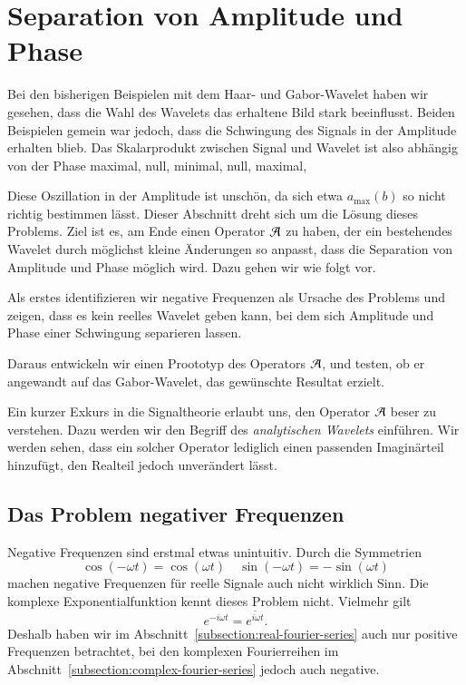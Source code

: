 \section{Separation von Amplitude und Phase}
\label{complex:separate}

Bei den bisherigen Beispielen mit dem Haar- und Gabor-Wavelet haben wir gesehen, dass die Wahl des Wavelets das erhaltene Bild stark beeinflusst.
Beiden Beispielen gemein war jedoch, dass die Schwingung des Signals in der Amplitude erhalten blieb.
Das Skalarprodukt zwischen Signal und Wavelet ist also abhängig von der Phase maximal, null, minimal, null, maximal, \textellipsis

Diese Oszillation in der Amplitude ist unschön, da sich etwa $a_\text{max}(b)$ so nicht richtig bestimmen lässt.
Dieser Abschnitt dreht sich um die Lösung dieses Problems.
Ziel ist es, am Ende einen Operator $\Ana\,$ zu haben, der ein bestehendes Wavelet durch möglichst kleine Änderungen so anpasst, dass die Separation von Amplitude und Phase möglich wird.
Dazu gehen wir wie folgt vor.

Als erstes identifizieren wir negative Frequenzen als Ursache des Problems und zeigen, dass es kein reelles Wavelet geben kann, bei dem sich Amplitude und Phase einer Schwingung separieren lassen.

Daraus entwickeln wir einen Proototyp des Operators $\Ana\,$, und testen, ob er angewandt auf das Gabor-Wavelet, das gewünschte Resultat erzielt.

Ein kurzer Exkurs in die Signaltheorie erlaubt uns, den Operator $\Ana\,$ beser zu verstehen. 
Dazu werden wir den Begriff des \emph{analytischen Wavelets} einführen.
Wir werden sehen, dass ein solcher Operator lediglich einen passenden Imaginärteil hinzufügt, den Realteil jedoch unverändert lässt.

\subsection{Das Problem negativer Frequenzen}
Negative Frequenzen sind erstmal etwas unintuitiv.
Durch die Symmetrien
\[
	\cos(-\omega t) = \cos(\omega t)
	\quad
	\sin(-\omega t) = -\sin(\omega t)
\]
machen negative Frequenzen für reelle Signale auch nicht wirklich Sinn.
Die komplexe Exponential\-funktion kennt dieses Problem nicht.
Vielmehr gilt
\begin{equation}
	e^{-i\omega t} = \overline{e^{i\omega t}}.\label{complex:exp-inv-conj}
\end{equation}
Deshalb haben wir im Abschnitt~\ref{subsection:real-fourier-series} auch nur positive Frequenzen betrachtet,
bei den komplexen Fourierreihen im Abschnitt~\ref{subsection:complex-fourier-series} jedoch auch negative.

